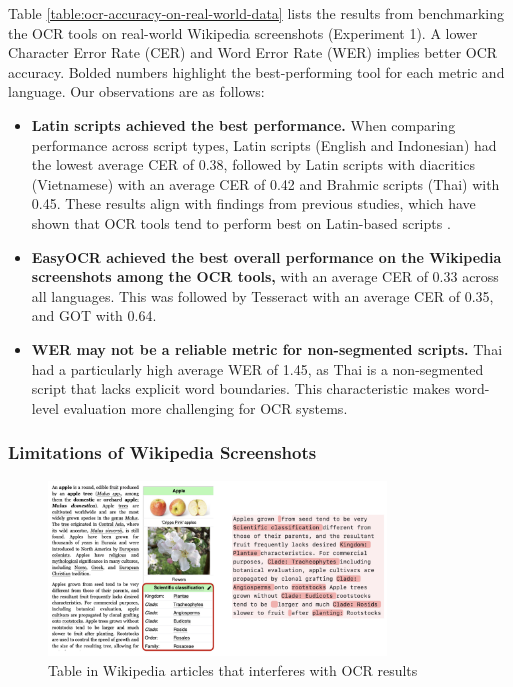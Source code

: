 \documentclass[12pt,oneside]{memoir}
\begin{document}
Table \ref{table:ocr-accuracy-on-real-world-data} lists the results from benchmarking the OCR tools on real-world Wikipedia screenshots (Experiment 1).
A lower Character Error Rate (CER) and Word Error Rate (WER) implies better OCR accuracy.
Bolded numbers highlight the best-performing tool for each metric and language. Our observations are as follows:

\begin{itemize}
    \item \textbf{Latin scripts achieved the best performance.} When comparing performance across script types, Latin scripts (English and Indonesian) had the lowest average CER of 0.38, followed by Latin scripts with diacritics (Vietnamese) with an average CER of 0.42 and Brahmic scripts (Thai) with 0.45. These results align with findings from previous studies, which have shown that OCR tools tend to perform best on Latin-based scripts \parencite{hegghammer-2022,ignat-etal-2022}.
    \item \textbf{EasyOCR achieved the best overall performance on the Wikipedia screenshots among the OCR tools,} with an average CER of 0.33 across all languages. This was followed by Tesseract with an average CER of 0.35, and GOT with 0.64. 
    \item \textbf{WER may not be a reliable metric for non-segmented scripts.} Thai had a particularly high average WER of 1.45, as Thai is a non-segmented script that lacks explicit word boundaries. This characteristic makes word-level evaluation more challenging for OCR systems.
\end{itemize}

\subsubsection{Limitations of Wikipedia Screenshots}

\begin{figure}[ht]
    \centering
    \includegraphics[width=0.8\textwidth]{images/wikipedia-limitations.png}
    \caption{Table in Wikipedia articles that interferes with OCR results}
    \label{figure:wikipedia-limitations}
\end{figure}
\end{document}
